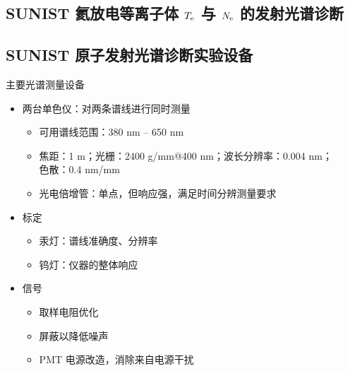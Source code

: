 \begin{CJK*}{UTF8}{kai}
\section{SUNIST 氦放电等离子体 $T_{\rm e}$ 与 $N_{\rm e}$ 的发射光谱诊断}

\subsection{SUNIST 原子发射光谱诊断实验设备}


\begin{frame}{主要光谱测量设备}
	\begin{itemize}
		\item 两台单色仪：对两条谱线进行同时测量
			\begin{itemize}
				\item 可用谱线范围：380 nm -- 650 nm
				\item 焦距：1 m；光栅：2400 g/mm@400 nm；波长分辨率：0.004 nm；
				\\色散：0.4 nm/mm
				\item 光电倍增管：单点，但响应强，满足时间分辨测量要求
			\end{itemize}
		\bigskip
		\item 标定
			\begin{itemize}
				\item 汞灯：谱线准确度、分辨率
				\item 钨灯：仪器的整体响应
			\end{itemize}
		\bigskip
		\item 信号
			\begin{itemize}
				\item 取样电阻优化
				\item 屏蔽以降低噪声
				\item PMT 电源改造，消除来自电源干扰
			\end{itemize}
	\end{itemize}
\end{frame}


\end{CJK*}
